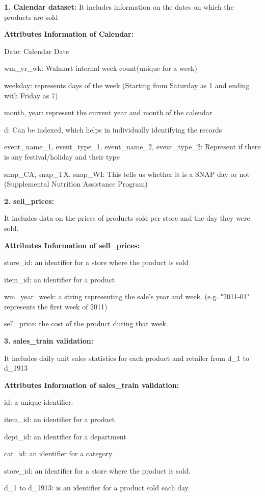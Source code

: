 \documentclass[fleqn,10pt]{SelfArx} %
\begin{document}
\item \textbf{1. Calendar dataset:}
It includes information on the dates on which the products are sold
\item \textbf{Attributes Information of Calendar:}
\item Date: Calendar Date
\item wm\_yr\_wk: Walmart internal week count(unique for a week)
\item weekday: represents days of the week (Starting from Saturday as 1 and ending with Friday as 7)
\item month, year: represent the current year and month of the calendar
\item d: Can be indexed, which helps in individually identifying the records
\item event\_name\_1, event\_type\_1, event\_name\_2, event\_type\_2: Represent if there is any festival/holiday and their type
\item snap\_CA, snap\_TX, snap\_WI: This tells us whether it is a SNAP day or not (Supplemental Nutrition Assistance Program)

\item \textbf{2. sell\_prices:}
\item It includes data on the prices of products sold per store and the day they were sold.
\item \textbf{Attributes Information of sell\_prices:}
\item store\_id: an identifier for a store where the product is sold
\item item\_id: an identifier for a product
\item wm\_year\_week: a string representing the sale's year and week. (e.g. "2011-01" represents the first week of 2011)
\item sell\_price: the cost of the product during that week.


\item \textbf{3. sales\_train validation:}
\item It includes daily unit sales statistics for each product and retailer from d\_1 to d\_1913
\item \textbf{Attributes Information of sales\_train validation:}

\item id: a unique identifier.
\item item\_id: an identifier for a product
\item dept\_id: an identifier for a department 
\item cat\_id: an identifier for a category 
\item store\_id: an identifier for a store where the product is sold.
\item d\_1 to d\_1913: is an identifier for a product sold each day.
\end{document}
